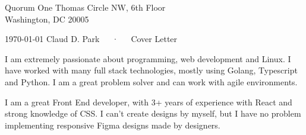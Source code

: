 


\recipient
  {Quorum}
  {One Thomas Circle NW, 6th Floor\\
  Washington, DC 20005 }




\makecvheader[R]

\makecvfooter
  {\today}
  {Claud D. Park~~~·~~~Cover Letter}
  {}

\makelettertitle

\begin{cvletter}

I am extremely passionate about programming, web development
and Linux.
I have worked with many full stack technologies, mostly using
Golang, Typescript and Python.
I am a great problem solver and can work with agile
environments.

I am a great Front End developer, with 3+ years of experience with React and strong knowledge of CSS.
I can't create designs by myself, but I have no problem implementing responsive Figma designs made by designers.


\end{cvletter}


\makeletterclosing


